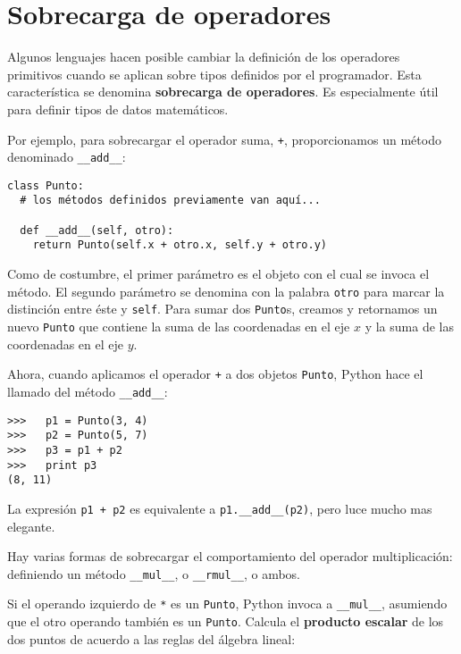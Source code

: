 \section{Sobrecarga de operadores}
\label{operator overloading}

Algunos lenguajes hacen posible cambiar la definición de los
operadores primitivos cuando se aplican sobre tipos definidos
por el programador. Esta característica se denomina {\bf sobrecarga
de operadores}.  Es especialmente útil para definir tipos de 
datos matemáticos.

Por ejemplo, para sobrecargar el operador suma, \texttt{+}, 
proporcionamos un método denominado \texttt{\_\_add\_\_}:

\beforeverb
\begin{verbatim}
class Punto:
  # los métodos definidos previamente van aquí...

  def __add__(self, otro):
    return Punto(self.x + otro.x, self.y + otro.y)
\end{verbatim}
\afterverb
%
Como de costumbre, el primer parámetro es el objeto con el cual
se invoca el método. El segundo parámetro se denomina con la
palabra \texttt{otro} para marcar la distinción entre éste y
 \texttt{self}.  Para sumar dos \texttt{Punto}s, creamos
y retornamos un nuevo  \texttt{Punto} que contiene la suma
de las coordenadas en el eje $x$ y la suma de las coordenadas
en el eje $y$.

Ahora, cuando aplicamos el operador \texttt{+} a dos objetos \texttt{Punto}, Python
hace el llamado del método \texttt{\_\_add\_\_}:

\beforeverb
\begin{verbatim}
>>>   p1 = Punto(3, 4)
>>>   p2 = Punto(5, 7)
>>>   p3 = p1 + p2
>>>   print p3
(8, 11)
\end{verbatim}
\afterverb
%
La expresión  \texttt{p1 + p2} es equivalente a
\texttt{p1.\_\_add\_\_(p2)}, pero luce mucho mas elegante.

Hay varias formas de sobrecargar el comportamiento del operador 
multiplicación: definiendo un método \texttt{\_\_mul\_\_}, o \texttt{\_\_rmul\_\_}, 
o ambos.

Si el operando izquierdo de  \texttt{*} es un  \texttt{Punto}, Python invoca
a \texttt{\_\_mul\_\_}, asumiendo que el otro operando también es un  \texttt{Punto}.  Calcula el  {\bf producto escalar} de los dos puntos
de acuerdo a las reglas del álgebra lineal:

